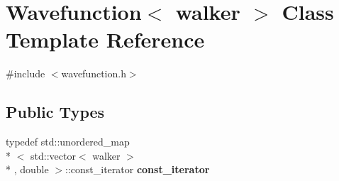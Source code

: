 \hypertarget{class_wavefunction}{\section{Wavefunction$<$ walker $>$ Class Template Reference}
\label{class_wavefunction}
}


{\ttfamily \#include $<$wavefunction.\+h$>$}

\subsection*{Public Types}
\begin{DoxyCompactItemize}
\item 
\hypertarget{class_wavefunction_a68f7658cb4bc528aa3848329f78b54f9}{typedef std\+::unordered\+\_\+map\\*
$<$ std\+::vector$<$ walker $>$\\*
, double $>$\+::const\+\_\+iterator {\bfseries const\+\_\+iterator}}\label{class_wavefunction_a68f7658cb4bc528aa3848329f78b54f9}

\end{DoxyCompactItemize}
